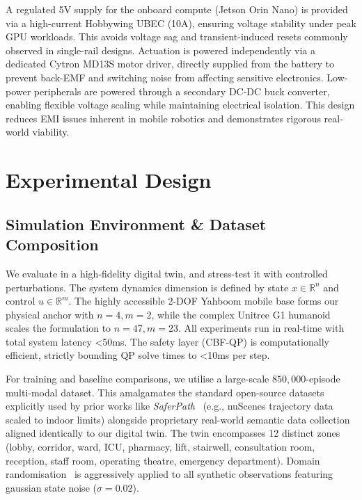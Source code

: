 \documentclass[10pt,twocolumn]{article}
\begin{document}
A regulated 5V supply for the onboard compute (Jetson Orin Nano) is provided via a high-current Hobbywing UBEC (10A), ensuring voltage stability under peak GPU workloads. This avoids voltage sag and transient-induced resets commonly observed in single-rail designs.
Actuation is powered independently via a dedicated Cytron MD13S motor driver, directly supplied from the battery to prevent back-EMF and switching noise from affecting sensitive electronics.
Low-power peripherals are powered through a secondary DC-DC buck converter, enabling flexible voltage scaling while maintaining electrical isolation.
This design reduces EMI issues inherent in mobile robotics and demonstrates rigorous real-world viability.

\section{Experimental Design}
\label{sec:experiments}

\subsection{Simulation Environment \& Dataset Composition}
We evaluate in a high-fidelity digital twin, and stress-test it with controlled perturbations. The system dynamics dimension is defined by state $x \in \mathbb{R}^n$ and control $u \in \mathbb{R}^m$. The highly accessible 2-DOF Yahboom mobile base forms our physical anchor with $n=4, m=2$, while the complex Unitree G1 humanoid scales the formulation to $n=47, m=23$. All experiments run in real-time with total system latency <50ms. The safety layer (CBF-QP) is computationally efficient, strictly bounding QP solve times to <10ms per step.

For training and baseline comparisons, we utilise a large-scale $850{,}000$-episode multi-modal dataset. This amalgamates the standard open-source datasets explicitly used by prior works like \textit{SaferPath}~\cite{zhang2026saferpath} (e.g., nuScenes trajectory data scaled to indoor limits) alongside proprietary real-world semantic data collection aligned identically to our digital twin. The twin encompasses 12 distinct zones (lobby, corridor, ward, ICU, pharmacy, lift, stairwell, consultation room, reception, staff room, operating theatre, emergency department). Domain randomisation~\cite{tobin2017domainrand} is aggressively applied to all synthetic observations featuring gaussian state noise ($\sigma = 0.02$).
\end{document}
